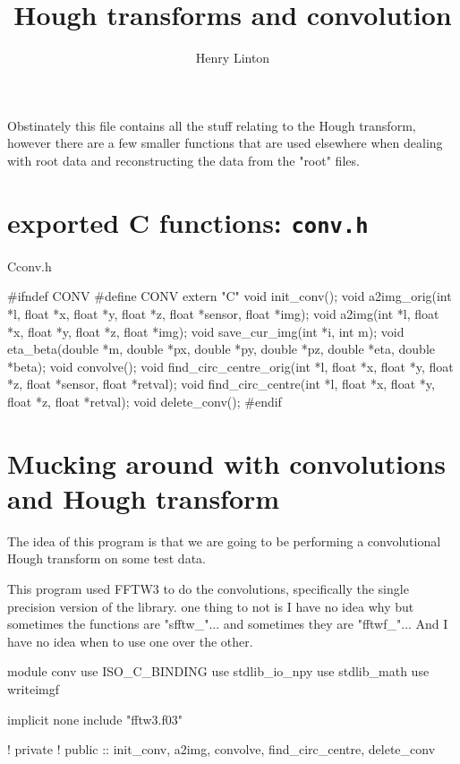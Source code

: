 \documentclass[10pt, a4paper]{article}
\title{Hough transforms and convolution}
\author{Henry Linton}
\begin{document}
\maketitle

Obstinately this file contains all the stuff relating to the Hough transform, however there are a few smaller functions that are used elsewhere when dealing with root data and reconstructing the data from the "root" files.

\section{exported C functions: \texttt{conv.h}}
\begin{subfile}{C}{conv.h}
\begin{code}
#ifndef CONV 
#define CONV
extern "C" {
	void init_conv();
	void a2img_orig(int *l,
	                float *x, float *y,  float *z,
	                float *sensor, float *img);
	void a2img(int *l,
	           float *x, float *y,  float *z,
	           float *img);
	void save_cur_img(int *i, int m);
	void eta_beta(double *m, double *px, double *py, double *pz,
	              double *eta, double *beta);
	void convolve();
	void find_circ_centre_orig(int *l,
	                           float *x, float *y, float *z,
	                           float *sensor, float *retval);
	void find_circ_centre(int *l,
	                      float *x, float *y, float *z,
	                      float *retval);
	void delete_conv();
}
#endif 
\end{code}
\end{subfile}

\section{Mucking around with convolutions and Hough transform}

The idea of this program is that we are going to be performing a convolutional Hough transform on some test data.

This program used FFTW3 to do the convolutions, specifically the single precision version of the library. 
one thing to not is I have no idea why but sometimes the functions are "sfftw_"... and sometimes they are "fftwf_"... And I have no idea when to use one over the other.

\begin{code}
module conv
	use ISO_C_BINDING
	use stdlib_io_npy 
	use stdlib_math 
	use writeimgf
	
	implicit none 
	include "fftw3.f03"
	
! 	private 
! 	public :: init_conv, a2img, convolve, find_circ_centre, delete_conv
\end{code}
\end{document}
